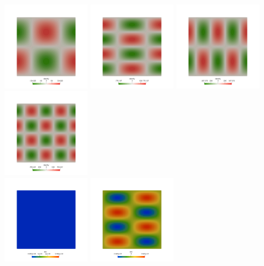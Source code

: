 \begin{center}
\includegraphics[width=3.74cm]{python_codes/fieldstone_32/results/rho_1x1}
\includegraphics[width=3.74cm]{python_codes/fieldstone_32/results/rho_1x2}
\includegraphics[width=3.74cm]{python_codes/fieldstone_32/results/rho_2x1}
\includegraphics[width=3.74cm]{python_codes/fieldstone_32/results/rho_2x2}\\
\includegraphics[width=3.74cm]{python_codes/fieldstone_32/results/exy_1x1}
\includegraphics[width=3.74cm]{python_codes/fieldstone_32/results/exy_1x2}

\end{center}

